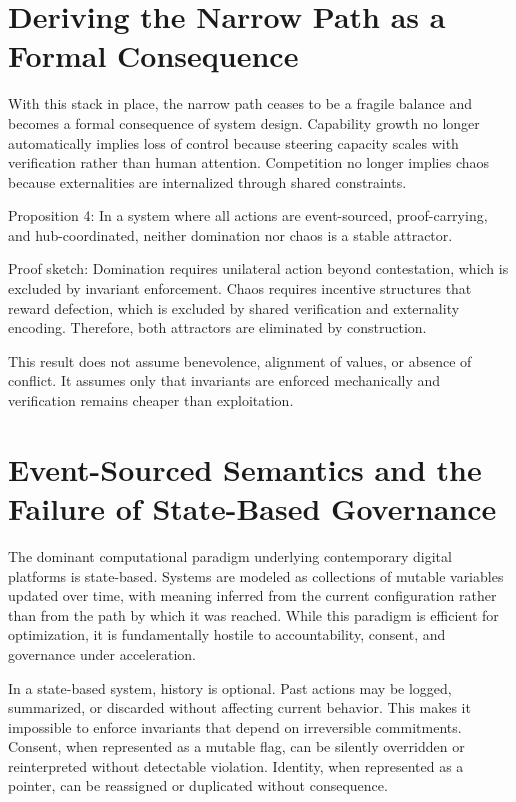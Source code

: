 \documentclass[11pt,oneside]{article}
\begin{document}
\section{Deriving the Narrow Path as a Formal Consequence}

With this stack in place, the narrow path ceases to be a fragile balance and becomes a formal consequence of system design. Capability growth no longer automatically implies loss of control because steering capacity scales with verification rather than human attention. Competition no longer implies chaos because externalities are internalized through shared constraints.

Proposition 4: In a system where all actions are event-sourced, proof-carrying, and hub-coordinated, neither domination nor chaos is a stable attractor.

Proof sketch: Domination requires unilateral action beyond contestation, which is excluded by invariant enforcement. Chaos requires incentive structures that reward defection, which is excluded by shared verification and externality encoding. Therefore, both attractors are eliminated by construction.

This result does not assume benevolence, alignment of values, or absence of conflict. It assumes only that invariants are enforced mechanically and verification remains cheaper than exploitation.

\section{Event-Sourced Semantics and the Failure of State-Based Governance}

The dominant computational paradigm underlying contemporary digital platforms is state-based. Systems are modeled as collections of mutable variables updated over time, with meaning inferred from the current configuration rather than from the path by which it was reached. While this paradigm is efficient for optimization, it is fundamentally hostile to accountability, consent, and governance under acceleration.

In a state-based system, history is optional. Past actions may be logged, summarized, or discarded without affecting current behavior. This makes it impossible to enforce invariants that depend on irreversible commitments. Consent, when represented as a mutable flag, can be silently overridden or reinterpreted without detectable violation. Identity, when represented as a pointer, can be reassigned or duplicated without consequence.
\end{document}
